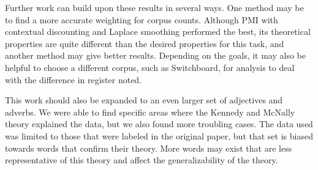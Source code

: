\documentclass[11pt]{article}
\begin{document}
Further work can build upon these results in several ways. One method may be to find a more accurate weighting for corpus counts. Although PMI with contextual discounting and Laplace smoothing performed the best, its theoretical properties are quite different than the desired properties for this task, and another method may give better results. Depending on the goals, it may also be helpful to choose a different corpus, such as Switchboard, for analysis to deal with the difference in register noted.

This work should also be expanded to an even larger set of adjectives and adverbs. We were able to find specific areas where the Kennedy and McNally theory explained the data, but we also found more troubling cases. The data used was limited to those that were labeled in the original paper, but that set is biased towards words that confirm their theory. More words may exist that are less representative of this theory and affect the generalizability of the theory.



\end{document}
